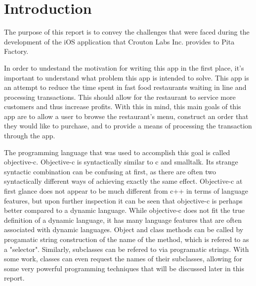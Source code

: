 \documentclass[se]{uw-wkrpt}
\begin{document}
\mainmatter

\section{Introduction}\label{sec:intro}

The purpose of this report is to convey the challenges that were faced
during the development of the iOS application that Crouton Labs Inc. 
provides to Pita Factory.

In order to undestand the motivation for writing this app in the first
place, it's important to understand what problem this app is intended
to solve. This app is an attempt to reduce the time spent in fast food restaurants
waiting in line and processing transactions. This should allow for the restaurant
to service more customers and thus increase profits. With this in mind,
this main goals of this app are to allow a user to browse the restaurant's
menu, construct an order that they would like to purchase, and to provide
a means of processing the transaction through the app.

The programming language that was used to accomplish this goal is called
objective-c. Objective-c is syntactically similar to c and smalltalk. Its strange
syntactic combination can be confusing at first, as there are often two
syntactically different ways of achieving exactly the same effect. Objective-c
at first glance does not appear to be much different from c++ in terms
of language features, but upon further inspection it can be seen that 
objective-c is perhaps better compared to a dynamic language. While objective-c
does not fit the true definition of a dynamic language, it has many 
language features that are often associated with dynamic languages. 
Object and class methods can be called by progamatic string construction
of the name of the method, which is refered to as a "selector".
Similarly, subclasses can be refered to via programatic strings. With some work,
classes can even request the names of their subclasses, allowing for
some very powerful programming techniques that will be discussed later in
this report.
\end{document}
